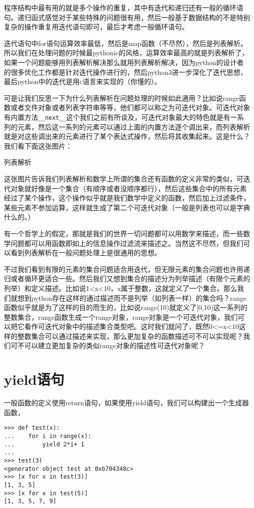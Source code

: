 \documentclass[12pt,oneside]{book}
\begin{document}
\begin{common-format}
程序结构中最有用的就是多个操作的重复，其中有迭代和递归还有一般的循环语句。递归函式感觉对于某些特殊的问题很有用，然后一般基于数据结构的不是特别复杂的操作重复用迭代语句即可，最后才考虑一般循环语句。

迭代语句中for语句运算效率最低，然后是map函数（不尽然），然后是列表解析。所以我们在处理问题的时候最pythonic的风格，运算效率最高的就是列表解析了，如果一个问题能够用列表解析解决那么就用列表解析解决，因为python的设计者的很多优化工作都是针对迭代操作进行的，然后python3进一步深化了迭代思想，最后python中的迭代是用c语言来实现的（你懂的）。

可是让我们反思一下为什么列表解析在问题处理的时候如此通用？比如说range函数或者文件对象或者列表字符串等等，他们都可以称之为可迭代对象。可迭代对象有内置方法\verb+__next__+这个我们之前有所谈及，可迭代对象最大的特色就是有一系列的元素，然后这一系列的元素可以通过上面的内置方法逐个调出来，而列表解析就是对这些调出来的元素进行了某个表达式操作，然后将其收集起来。这是什么？我们看下面这张图片：
\begin{fig}{列表解析}
\caption{列表解析}
\label{fig:列表解析}
\end{fig}

这张图片告诉我们列表解析和数学上所谓的集合还有函数的定义非常的类似，可迭代对象就好像是一个集合（有顺序或者没顺序都行），然后这些集合中的所有元素经过了某个操作，这个操作似乎就是我们数学中定义的函数，然后加上过滤条件，某些元素不参加运算，这样就生成了第二个可迭代对象（一般是列表也可以是字典什么的。）

有一个哲学上的假定，那就是我们的世界一切问题都可以用数学来描述，而一些数学问题都可以用函数即如上的信息操作过滤流来描述之。当然这不尽然，但我们可以看到列表解析在一般问题处理上是很通用的思想。

不过我们看到有限的元素的集合问题适合用迭代，但无限元素的集合问题也许用递归或者循环更适合一些。然后我们又想到集合的描述分为列举描述（有限个元素的列举）和定义描述。比如说1<x<10，x属于整数，这就定义了一个集合。那么我们就想到python存在这样的通过描述而不是列举（如列表一样）的集合吗？range函数似乎就是为了这样的目的而生的，比如说range(10)就定义了[0,10)这一系列的整数集合，range函数生成一个range对象，range对象是一个可迭代对象，我们可以把它看作可迭代对象中的描述集合类型吧。这时我们就问了，既然0<=x<10这样的整数集合可以通过描述来实现，那么更加复杂的函数描述可不可以实现呢？我们可不可以建立更加复杂的类似range对象的描述性可迭代对象呢？

\section{yield语句}
一般函数的定义使用return语句，如果使用yield语句，我们可以构建出一个生成器函数，
\begin{Verbatim}
>>> def test(x):
...    for i in range(x):
...        yield 2*i+ 1
... 
>>> test(3)
<generator object test at 0xb704348c>
>>> [x for x in test(3)]
[1, 3, 5]
>>> [x for x in test(5)]
[1, 3, 5, 7, 9]
\end{Verbatim}


\end{common-format}
\end{document}
